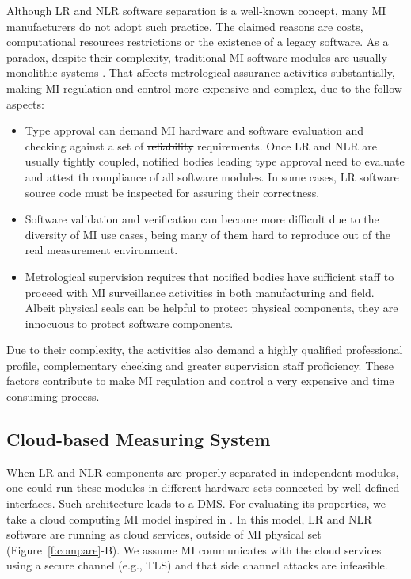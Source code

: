 \documentclass[journal]{IEEEtran}
\providecommand{\DIFadd}[1]{{\protect\color{blue}\uwave{#1}}} %
\providecommand{\DIFdel}[1]{{\protect\color{red}\sout{#1}}}                      %
\providecommand{\DIFaddbegin}{} %
\providecommand{\DIFaddend}{} %
\providecommand{\DIFdelbegin}{} %
\providecommand{\DIFdelend}{} %
\begin{document}
Although LR and NLR software separation is a well-known concept, many MI manufacturers do not adopt such practice. The claimed reasons are costs, computational resources restrictions or the existence of a legacy software. As a paradox, despite their complexity, traditional MI software modules are usually monolithic systems \DIFaddbegin \DIFadd{\mbox{%
\cite{Abreu2017}}%
}\DIFaddend . That affects metrological assurance activities substantially, making MI regulation and control more expensive and complex, due to the follow aspects:
 \begin{itemize} 
\item Type approval can demand MI hardware and software evaluation and checking against a set of \DIFdelbegin \DIFdel{reliability }\DIFdelend \DIFaddbegin \DIFadd{integrity }\DIFaddend requirements. Once LR and NLR are usually tightly coupled, notified bodies leading type approval need to evaluate and attest th compliance of all software modules. In some cases, LR software source code must be inspected for assuring their correctness.
\item Software validation and verification can become more difficult due to the diversity of MI use cases, being many of them hard to reproduce out of the real measurement environment. 
\item Metrological supervision requires that notified bodies have sufficient staff to proceed with MI surveillance activities in both manufacturing and field. Albeit physical seals can be helpful to protect physical components, they are innocuous to protect software components.
 \end{itemize} 

Due to their complexity, the activities also demand a highly qualified professional profile, complementary checking and greater supervision staff proficiency. These factors contribute to make MI regulation and control a very expensive and time consuming process.

\subsection{Cloud-based Measuring System}
\label{s:mi_cloud}
When LR and NLR components are properly separated in independent modules, one could run these modules in different hardware sets connected by well-defined interfaces. Such architecture leads to a DMS. For evaluating its properties, we take a cloud computing MI model inspired in \cite{Oppermann2016}. In this model, LR and NLR software are running as cloud services, outside of MI physical set (Figure~\ref{f:compare}-B). We assume MI communicates with the cloud services using a secure channel (e.g., TLS) and that side channel attacks are infeasible.
\end{document}
